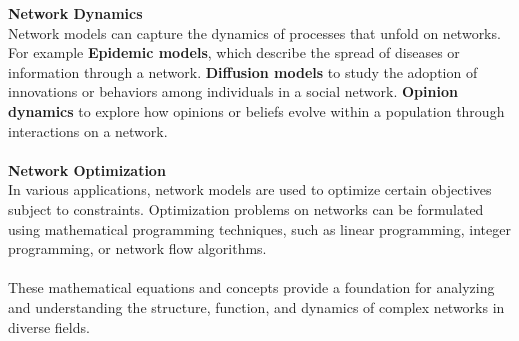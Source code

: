 \documentclass[12pt]{article}
\begin{document}
\noindent \textbf{Network Dynamics}\\
Network models can capture the dynamics of processes that unfold on networks. For example 
\textbf{Epidemic models}, which describe the spread of diseases or information
through a network. \textbf{Diffusion models} to study the adoption of innovations or behaviors
among individuals in a social network. \textbf{Opinion dynamics} to explore how opinions or
beliefs evolve within a population through interactions on a network.\\
\\
\textbf{Network Optimization}\\
In various applications, network models are used to optimize certain objectives subject to
constraints. Optimization problems on networks can be formulated using mathematical
programming techniques, such as linear programming, integer programming, or network
flow algorithms.\\
\\
These mathematical equations and concepts provide a foundation for analyzing and understanding
the structure, function, and dynamics of complex networks in diverse fields.
\newpage
\printbibliography
\end{document}
